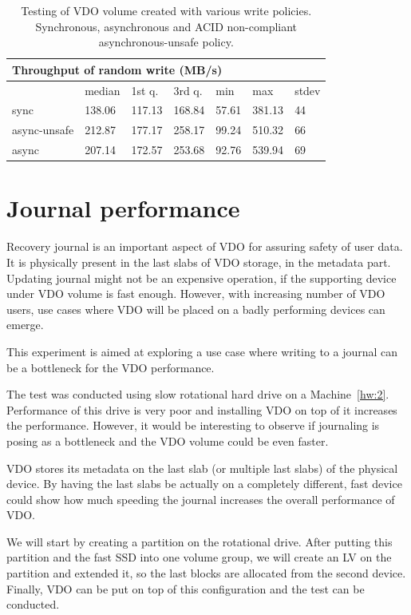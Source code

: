 \documentclass[
  color, %
  table, %
  lof,   %
  lot,   %
]{fithesis3}
\begin{document}
\begin{table}
\begin{tabular}{|l|l|l|l|l|l|l|}
        \hline
        \multicolumn{7}{|l|}{Throughput of random write (MB/s)} \\ \hline
         & median & 1st q. & 3rd q. & min & max & stdev \\ \hline 
sync & 138.06 & 117.13 & 168.84 & 57.61 & 381.13 & 44 \\ \hline
async-unsafe & 212.87 & 177.17 & 258.17 & 99.24 & 510.32 & 66 \\ \hline
async & 207.14 & 172.57 & 253.68 & 92.76 & 539.94 & 69 \\ \hline
\end{tabular}
\caption[Performance of various write policies]{Testing of VDO volume created with various write policies. Synchronous, asynchronous and ACID non-compliant asynchronous-unsafe policy.}
\label{tab:writepolicies}
\end{table}

\section{Journal performance}
Recovery journal is an important aspect of VDO for assuring safety of user data. It is physically present in the last slabs of VDO storage, in the metadata part. Updating journal might not be an expensive operation, if the supporting device under VDO volume is fast enough. However, with increasing number of VDO users, use cases where VDO will be placed on a badly performing devices can emerge.

This experiment is aimed at exploring a use case where writing to a journal can be a bottleneck for the VDO performance.

The test was conducted using slow rotational hard drive on a Machine~\ref{hw:2}. Performance of this drive is very poor and installing VDO on top of it increases the performance. However, it would be interesting to observe if journaling is posing as a bottleneck and the VDO volume could be even faster.

VDO stores its metadata on the last slab (or multiple last slabs) of the physical device. By having the last slabs be actually on a completely different, fast device could show how much speeding the journal increases the overall performance of VDO.

We will start by creating a partition on the rotational drive. After putting this partition and the fast SSD into one volume group, we will create an LV on the partition and extended it, so the last blocks are allocated from the second device. Finally, VDO can be put on top of this configuration and the test can be conducted.
\end{document}
